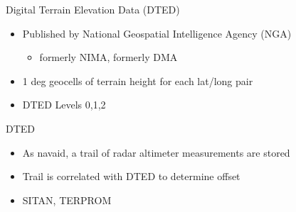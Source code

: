\begin{frame}
Digital Terrain Elevation Data (DTED)
 \begin{itemize}
 \item Published by National Geospatial Intelligence Agency (NGA)
	\begin{itemize}
		\item formerly NIMA, formerly DMA
	\end{itemize}
 \item 1 deg geocells of terrain height for each lat/long pair
 \item DTED Levels 0,1,2
\end{itemize}
\end{frame}

\begin{frame}
DTED
\begin{itemize}
  \item As navaid, a trail of radar altimeter measurements are stored
  \item Trail is correlated with DTED to determine offset
  \item SITAN, TERPROM
\end{itemize} 
\end{frame}

